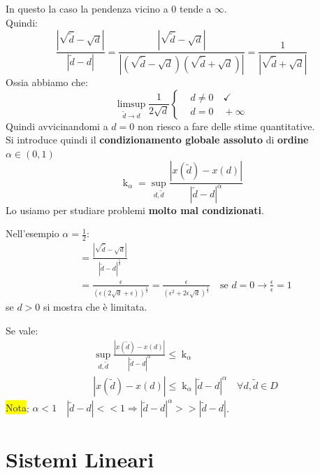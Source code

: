 \documentclass{article}
\begin{document}
In questo la caso la pendenza vicino a $0$ tende a $\infty$.\\
Quindi: \[\frac{\left|\sqrt{\widetilde{d}}-\sqrt{d}\right|}{\left|\widetilde{d}-d\right|}=\frac{\left|\sqrt{\widetilde{d}}-\sqrt{d}\right|}{\left|\left(\sqrt{\widetilde{d}}-\sqrt{d}\right)\left(\sqrt{\widetilde{d}}+\sqrt{d}\right)\right|}=\frac{1}{\left|\sqrt{\widetilde{d}}+\sqrt{d}\right|}\]
Ossia abbiamo che:
\[
    \limsup_{\widetilde{d}\to d}\frac{1}{2\sqrt{d}}
    \begin{cases}
         & d\ne0\quad\checkmark \\
         & d=0\quad+\infty
    \end{cases}
\]
Quindi avvicinandomi a $d=0$ non riesco a fare delle stime quantitative.\\
Si introduce quindi il \textbf{condizionamento globale assoluto} di \textbf{ordine} $\alpha\in(0,1)$
\[\operatorname{k}_{\alpha}=\boxed{\sup_{d,\widetilde{d}}\frac{\left|x(\widetilde{d})-x(d)\right|}{\left|\widetilde{d}-d\right|^\alpha}}\]
Lo usiamo per studiare problemi \textbf{molto mal condizionati}.

Nell'esempio $\alpha=\frac{1}{2}$:
\begin{align*}
     & =\frac{\left|\sqrt{\widetilde{d}}-\sqrt{d}\right|}{\left|\widetilde{d}-d\right|^{\frac 12}}                                                                                                          \\
     & =\frac{\epsilon}{\left(\epsilon(2\sqrt{d}+\epsilon)\right)^{\frac 12}}=\frac{\epsilon}{\left(\epsilon^2+2\epsilon\sqrt d\right)^{\frac 12}}\quad \text{se }d=0\rightarrow\frac{\epsilon}{\epsilon}=1
\end{align*}
se $d>0$ si mostra che è limitata.

Se vale:
\begin{align*}
     & \sup_{d,\widetilde{d}}\frac{\left|x(\widetilde{d})-x(d)\right|}{\left|\widetilde{d}-d\right|^\alpha}\le \operatorname{k}_\alpha  \\
     & \left|x(\widetilde{d})-x(d)\right|\le\operatorname{k}_\alpha\left|\widetilde{d}-d\right|^\alpha\quad\forall d,\widetilde{d}\in D
\end{align*}
\colorbox{yellow}{Nota}: $\alpha<1\quad\left|\widetilde{d}-d\right|<<1\Rightarrow\left|\widetilde{d}-d\right|^\alpha >>\left|\widetilde{d}-d\right|$.


\section{Sistemi Lineari}
\end{document}
